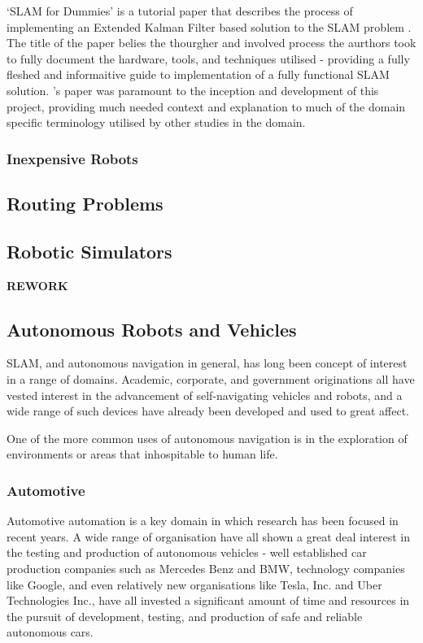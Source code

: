 `SLAM for Dummies' is a tutorial paper that describes the process of
implementing an Extended Kalman Filter based solution to the SLAM problem
\cite{Riisgaard2004}.  
The title of the paper belies the thourgher and involved process the aurthors
took to fully document the hardware, tools, and techniques utilised -
providing a fully fleshed and informaitive guide to implementation of a fully
functional SLAM solution.
\citeauthor{Riisgaard2004}'s paper was paramount to the inception and
development of this project, providing much needed context and explanation to
much of the domain specific terminology utilised by other studies in the
domain.

\subsubsection{Inexpensive Robots}

\subsection{Routing Problems}

\subsection{Robotic Simulators}



\pagebreak
{\bf REWORK}
\subsection{Autonomous Robots and Vehicles}
SLAM, and autonomous navigation in general, has long been concept of interest
in a range of domains.
Academic, corporate, and government originations all have vested interest in
the advancement of self-navigating vehicles and robots, and a wide range of
such devices have already been developed and used to great affect.

One of the more common uses of autonomous navigation is in the exploration of
environments or areas that inhospitable to human life.

\subsubsection{Automotive}
Automotive automation is a key domain in which research has been focused in
recent years.
A wide range of organisation have all shown a great deal interest in the testing
and production of autonomous vehicles - well established car production companies
such as Mercedes Benz and BMW, technology companies like Google, and even
relatively new organisations like Tesla, Inc. and Uber Technologies Inc., have
all invested a significant amount of time and resources in the pursuit of
development, testing, and production of safe and reliable autonomous cars.

